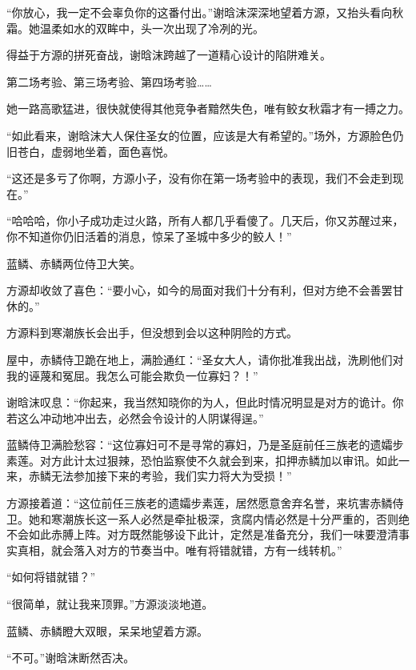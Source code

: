 \begin{this_body}
“你放心，我一定不会辜负你的这番付出。”谢晗沫深深地望着方源，又抬头看向秋霜。她温柔如水的双眸中，头一次出现了冷冽的光。

得益于方源的拼死奋战，谢晗沫跨越了一道精心设计的陷阱难关。

第二场考验、第三场考验、第四场考验……

她一路高歌猛进，很快就使得其他竞争者黯然失色，唯有鲛女秋霜才有一搏之力。

“如此看来，谢晗沫大人保住圣女的位置，应该是大有希望的。”场外，方源脸色仍旧苍白，虚弱地坐着，面色喜悦。

“这还是多亏了你啊，方源小子，没有你在第一场考验中的表现，我们不会走到现在。”

“哈哈哈，你小子成功走过火路，所有人都几乎看傻了。几天后，你又苏醒过来，你不知道你仍旧活着的消息，惊呆了圣城中多少的鲛人！”

蓝鳞、赤鳞两位侍卫大笑。

方源却收敛了喜色：“要小心，如今的局面对我们十分有利，但对方绝不会善罢甘休的。”

方源料到寒潮族长会出手，但没想到会以这种阴险的方式。

屋中，赤鳞侍卫跪在地上，满脸通红：“圣女大人，请你批准我出战，洗刷他们对我的诬蔑和冤屈。我怎么可能会欺负一位寡妇？！”

谢晗沫叹息：“你起来，我当然知晓你的为人，但此时情况明显是对方的诡计。你若这么冲动地冲出去，必然会令设计的人阴谋得逞。”

蓝鳞侍卫满脸愁容：“这位寡妇可不是寻常的寡妇，乃是圣庭前任三族老的遗孀步素莲。对方此计太过狠辣，恐怕监察使不久就会到来，扣押赤鳞加以审讯。如此一来，赤鳞无法参加接下来的考验，我们实力将大为受损！”

方源接着道：“这位前任三族老的遗孀步素莲，居然愿意舍弃名誉，来坑害赤鳞侍卫。她和寒潮族长这一系人必然是牵扯极深，贪腐内情必然是十分严重的，否则绝不会如此赤膊上阵。对方既然能够设下此计，定然是准备充分，我们一味要澄清事实真相，就会落入对方的节奏当中。唯有将错就错，方有一线转机。”

“如何将错就错？”

“很简单，就让我来顶罪。”方源淡淡地道。

蓝鳞、赤鳞瞪大双眼，呆呆地望着方源。

“不可。”谢晗沫断然否决。

\end{this_body}

